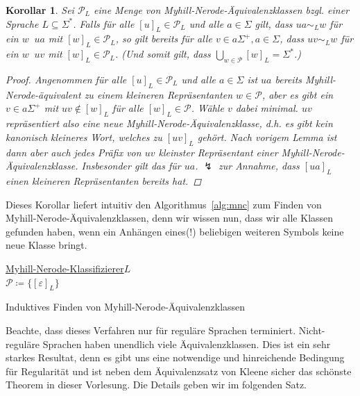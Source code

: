 \documentclass[11pt, a4paper]{article}
\theoremstyle{definition}
\theoremstyle{plain}
\newtheorem{corollary}[definition]{Korollar}
\numberwithin{equation}{section}
\DeclareMathOperator{\canon}{\prec_\text{cn}}
\begin{document}
\begin{corollary}
	Sei $\mathcal{P}_L$ eine Menge von Myhill-Nerode-Äquivalenzklassen bzgl. einer Sprache $L \subseteq \Sigma^\ast$. Falls für alle $[u]_L \in \mathcal{P}_L$ und alle $a \in \Sigma$ gilt, dass $ua \sim_L w$ für ein $w \canon ua$ mit $[w]_L \in \mathcal{P}_L$, so gilt bereits für alle $v \in a\Sigma^+, a \in \Sigma$, dass $uv \sim_L w$ für ein $w \canon uv$ mit $[w]_L \in \mathcal{P}_L$. (Und somit gilt, dass $\bigcup_{w \in \mathcal{P}} [w]_L = \Sigma^\ast$.)
	\begin{proof}
		Angenommen für alle $[u]_L\in \mathcal{P}_L$ und alle $a \in \Sigma$ ist $ua$ bereits Myhill-Nerode-äquivalent zu einem kleineren Repräsentanten $w \in \mathcal{P}$, aber es gibt ein $v \in a\Sigma^+$ mit $uv \notin [w]_L$ für alle $[w]_L \in \mathcal{P}$. Wähle $v$ dabei minimal. $uv$ repräsentiert also eine neue Myhill-Nerode-Äquivalenzklasse, d.h. es gibt kein kanonisch kleineres Wort, welches zu $[uv]_L$ gehört. Nach vorigem Lemma ist dann aber auch jedes Präfix von $uv$ kleinster Repräsentant einer Myhill-Nerode-Äquivalenzklasse. Insbesonder gilt das für $ua$. $\lightning$ zur Annahme, dass $[ua]_L$ einen kleineren Repräsentanten bereits hat.
	\end{proof}
\end{corollary}
Dieses Korollar liefert intuitiv den Algorithmus~\ref{alg:mnc} zum Finden von Myhill-Nerode-Ä\-qui\-va\-lenz\-klas\-sen, denn wir wissen nun, dass wir alle Klassen gefunden haben, wenn ein Anhängen eines(!) beliebigen weiteren Symbols keine neue Klasse bringt.
\begin{algorithm}
	\underline{Myhill-Nerode-Klassifizierer}{$L$}\\
	$\mathcal{P} \coloneqq \{[\varepsilon]_L\}$\\
	\caption{Induktives Finden von Myhill-Nerode-Äquivalenzklassen}
	\label{alg:mnc}
\end{algorithm}
Beachte, dass dieses Verfahren nur für reguläre Sprachen terminiert. Nicht-reguläre Sprachen haben unendlich viele Äquivalenzklassen. Dies ist ein sehr starkes Resultat, denn es gibt uns eine notwendige und hinreichende Bedingung für Regularität und ist neben dem Äquivalenzsatz von Kleene sicher das schönste Theorem in dieser Vorlesung. Die Details geben wir im folgenden Satz.
\end{document}

